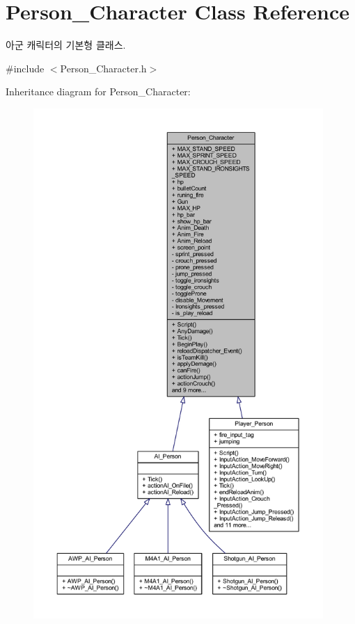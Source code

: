 \hypertarget{class_person___character}{}\section{Person\+\_\+\+Character Class Reference}
\label{class_person___character}


아군 캐릭터의 기본형 클래스.  




{\ttfamily \#include $<$Person\+\_\+\+Character.\+h$>$}



Inheritance diagram for Person\+\_\+\+Character\+:
\nopagebreak
\begin{figure}[H]
\begin{center}
\leavevmode
\includegraphics[height=550pt]{class_person___character__inherit__graph}
\end{center}
\end{figure}


